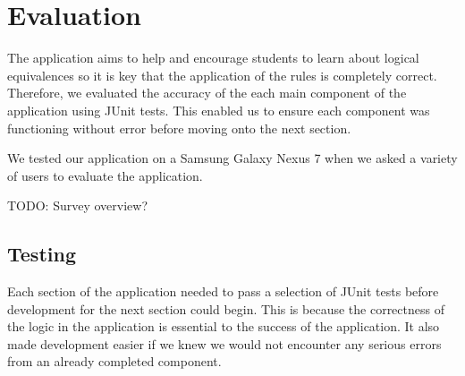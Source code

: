 \documentclass{report}
\begin{document}
\begin{comment}
\item Difficulty Settings - We want to set difficulty in a variety of ways, these include:

\begin{itemize}
\item When generating equivalences, the start formula length can be varied and rules can be applied more or fewer times depending on difficulty.
\item No help functionality for higher difficulties.
\item There is also the possibility of recommending a difficulty for the user based on how many previous equivalences they have completed, or how close their solutions have been to the optimum.
\end{itemize}

\item Extra operators - New operators could be added to the grammar such as XOR and NAND. These could be implemented as a separate grammar and they are likely to be used separately from the standard set of operators.
\end{itemize}

\end{enumerate}

\end{comment}

\chapter{Evaluation}

The application aims to help and encourage students to learn about logical equivalences so it is key that the application of the rules is completely correct. Therefore, we evaluated the accuracy of the each main component of the application using JUnit tests. This enabled us to ensure each component was functioning without error before moving onto the next section.

We tested our application on a Samsung Galaxy Nexus 7 when we asked a variety of users to evaluate the application.

TODO: Survey overview?

\section{Testing}

Each section of the application needed to pass a selection of JUnit tests before development for the next section could begin. This is because the correctness of the logic in the application is essential to the success of the application. It also made development easier if we knew we would not encounter any serious errors from an already completed component.
\end{document}
